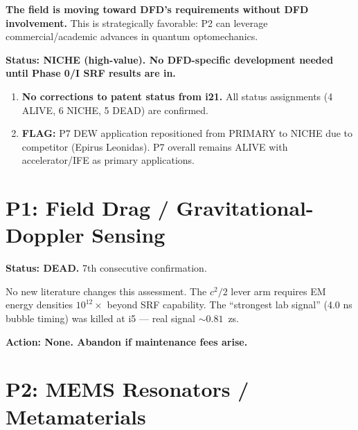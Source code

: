 \documentclass[11pt]{article}
\begin{document}
\begin{tcolorbox}[colback=blue!5!white, colframe=blue!70!black,
  title=\textbf{W4i22 TOP 5 FINDINGS --- PATENT TEAM}]
\begin{enumerate}
  \textbf{The field is moving toward DFD's requirements without DFD
  involvement.}  This is strategically favorable: P2 can leverage
  commercial/academic advances in quantum optomechanics.

  \textbf{Status: NICHE (high-value).  No DFD-specific development
  needed until Phase 0/I SRF results are in.}

\end{enumerate}
\end{tcolorbox}


\begin{tcolorbox}[colback=red!5!white, colframe=red!60!black,
  title=\textbf{CORRECTIONS AND FLAGS}]
\begin{enumerate}[nosep]
\item \textbf{No corrections to patent status from i21.}  All status
  assignments (4 ALIVE, 6 NICHE, 5 DEAD) are confirmed.

\item \textbf{FLAG:}  P7 DEW application repositioned from PRIMARY to
  NICHE due to competitor (Epirus Leonidas).  P7 overall remains ALIVE
  with accelerator/IFE as primary applications.
\end{enumerate}
\end{tcolorbox}


\newpage
\section{P1: Field Drag / Gravitational-Doppler Sensing}

\textbf{Status: DEAD.}  7th consecutive confirmation.

No new literature changes this assessment.  The $c^2/2$ lever arm requires
EM energy densities $10^{12}\times$ beyond SRF capability.  The ``strongest
lab signal'' (4.0 ns bubble timing) was killed at i5 --- real signal
$\sim 0.81$~zs.

\textbf{Action: None.  Abandon if maintenance fees arise.}


\section{P2: MEMS Resonators / Metamaterials}
\end{document}
